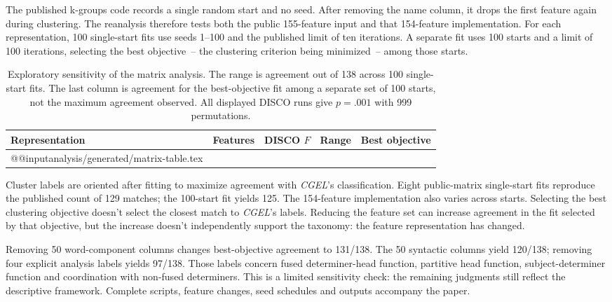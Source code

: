 \documentclass[12pt]{article}
\makeatletter
\newcommand{\tablebody}[1]{\csname @@input\endcsname #1 }
\makeatother
\begin{document}
The published k-groups code records a single random start and no seed. After removing the name column, it drops the first feature again during clustering. The reanalysis therefore tests both the public 155-feature input and that 154-feature implementation. For each representation, 100 single-start fits use seeds 1--100 and the published limit of ten iterations. A separate fit uses 100 starts and a limit of 100 iterations, selecting the best objective~-- the clustering criterion being minimized~-- among those starts.

\begin{table}[htbp]
\centering\small
\caption{Exploratory sensitivity of the matrix analysis. The range is agreement out of 138 across 100 single-start fits. The last column is agreement for the best-objective fit among a separate set of 100 starts, not the maximum agreement observed. All displayed DISCO runs give \mbox{$p=.001$} with 999 permutations.}\label{tab:matrix}
\begin{tabular}{>{\raggedright\arraybackslash}p{5.1cm}rrrr}
\toprule
Representation & Features & DISCO $F$ & Range & Best objective \\
\midrule
\tablebody{analysis/generated/matrix-table.tex}
\bottomrule
\end{tabular}
\end{table}

Cluster labels are oriented after fitting to maximize agreement with \textit{CGEL}'s classification. Eight public-matrix single-start fits reproduce the published count of 129 matches; the 100-start fit yields 125. The 154-feature implementation also varies across starts. Selecting the best clustering objective doesn't select the closest match to \textit{CGEL}'s labels. Reducing the feature set can increase agreement in the fit selected by that objective, but the increase doesn't independently support the taxonomy: the feature representation has changed.

Removing 50 word-component columns changes best-objective agreement to 131/138. The 50 syntactic columns yield 120/138; removing four explicit analysis labels yields 97/138. Those labels concern fused determiner-head function, partitive head function, subject-determiner function and coordination with non-fused determiners. This is a limited sensitivity check: the remaining judgments still reflect the descriptive framework. Complete scripts, feature changes, seed schedules and outputs accompany the paper.

\clearpage
\printbibliography
\end{document}

